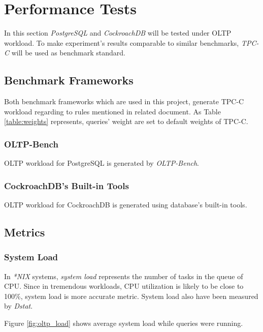\documentclass[report.tex]{subfiles}
\begin{document}
\section{Performance Tests}

In this section \textit{PostgreSQL}\cite{postgres} and \textit{CockroachDB}\cite{cockroach} will be tested under OLTP workload. To make experiment's results comparable to similar benchmarks, \textit{TPC-C}\cite{tpcc} will be used as benchmark standard.

\subsection{Benchmark Frameworks}

Both benchmark frameworks which are used in this project, generate TPC-C workload regarding to rules mentioned in related document\cite{tpcc}. As Table \ref{table:weights} represents, queries' weight are set to default weights of TPC-C.

\subsubsection{OLTP-Bench}
OLTP workload for PostgreSQL is generated by \textit{OLTP-Bench}\cite{oltpbench}.

\subsubsection{CockroachDB's Built-in Tools}
OLTP workload for CockroachDB is generated using database's built-in tools\cite{workload}.

\subsection{Metrics}
\subsubsection{System Load}
In \textit{*NIX} systems, \textit{system load} represents the number of tasks in the queue of CPU. Since in tremendous workloads, CPU utilization is likely to be close to 100\%, system load is more accurate metric. System load also have been measured by \textit{Dstat}\cite{dstat}.


Figure \ref{fig:oltp_load} shows average system load while queries were running.
\end{document}
